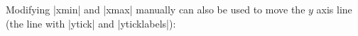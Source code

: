 {\noindent Modifying |xmin| and |xmax| manually can also be used to move the $y$ axis line (the line with |ytick| and |yticklabels|):
\begin{codeexample}[]
\end{codeexample}
}
